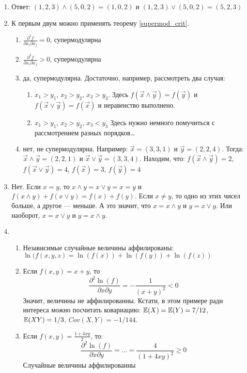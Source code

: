 \begin{enumerate}
\item Ответ: $ (1,2,3)\wedge (5,0,2)=(1,0,2) $ и $ (1,2,3)\vee (5,0,2)=(5,2,3) $

\item К первым двум можно применять теорему \ref{supermod_crit}.
\begin{enumerate}
\item $ \frac{\partial^{2} f}{\partial x_{i}\partial x_{j}}=0 $, супермодулярна
\item $ \frac{\partial^{2} f}{\partial x_{i}\partial x_{j}}>0 $, супермодулярна
\item да, супермодулярна. Достаточно, например, рассмотреть два случая:
\begin{enumerate}
\item $ x_{1}>y_{1} $, $ x_{2}>y_{2} $, $x_{3}>y_{3}$. Здесь $ f(\vec{x}\wedge \vec{y})=f(\vec{y}) $ и $ f(\vec{x}\vee \vec{y})=f(\vec{x}) $ и неравенство выполнено.
\item $ x_{1}>y_{1} $, $ x_{2}>y_{2} $, $x_{3}<y_{3}$ Здесь нужно немного помучиться с рассмотрением разных порядков\ldots
\end{enumerate}
\item нет, не супермодулярна. Например: $ \vec{x}=(3,3,1) $ и $ \vec{y}=(2,2,4) $. Тогда: $ \vec{x}\wedge \vec{y}=(2,2,1) $ и $ \vec{x}\vee\vec{y}=(3,3,4) $. Находим, что: $ f(\vec{x}\wedge \vec{y})=2 $, $ f(\vec{x}\vee \vec{y})=4 $, $ f(\vec{x})=3 $, $ f(\vec{y})=4 $

\end{enumerate}

\item Нет. Если $ x=y $, то $ x\wedge y=x\vee y=x=y $  и $ f(x\wedge y)+f(x\vee y)= f(x)+f(y) $. Если $ x\neq y $, то одно из этих чисел больше, а другое — меньше. А это значит, что $ x=x\wedge y $ и $ y=x \vee y $. Или наоборот, $ x=x\vee y $ и $ y=x\wedge y $.

\item {}
\begin{enumerate}
\item Независимые случайные величины аффилированы:
$\ln(f(x,y,z)=\ln(f(x))+\ln(f(y))+\ln(f(z)) $
\item Если $ f(x,y)=x+y $, то
\begin{equation}
\frac{\partial^{2} \ln(f)}{\partial x \partial y}=-\frac{1}{(x+y)^{2}}<0
\end{equation}
Значит, величины не аффилированны. Кстати, в этом примере ради интереса можно посчитать ковариацию: $ \operatorname{\mathbb{E}}(X)=\operatorname{\mathbb{E}}(Y)=7/12 $, $ \operatorname{\mathbb{E}}(XY)=1/3 $, $ Cov(X,Y)=-1/144 $.
\item Если  $ f(x,y)=\frac{1+4xy}{2} $, то:
\begin{equation}
\frac{\partial^{2} \ln(f)}{\partial x \partial y}=\ldots=\frac{4}{(1+4xy)^{2}}\geq 0
\end{equation}
Случайные величины аффилированны


\end{enumerate}
\end{enumerate}
